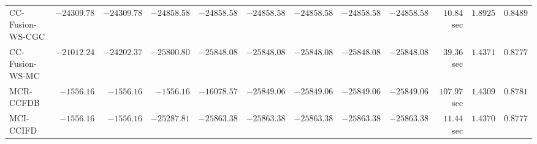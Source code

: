 \begin{table}[H]
\begin{tabular}{lrrrrrrrrrrr}
    CC-Fusion-WS-CGC & $    -24309.78$ & $    -24309.78$ & $    -24858.58$ & $    -24858.58$ & $    -24858.58$ & $    -24858.58$ & $    -24858.58$ & $    -24858.58$ & $        10.84$ sec    & $       1.8925$  & $       0.8489$ \\ 
     CC-Fusion-WS-MC & $    -21012.24$ & $    -24202.37$ & $    -25800.80$ & $    -25848.08$ & $    -25848.08$ & $    -25848.08$ & $    -25848.08$ & $    -25848.08$ & $        39.36$ sec    & $       1.4371$  & $       0.8777$ \\ 
\cmidrule{1-1} 
           MCR-CCFDB & $     -1556.16$ & $     -1556.16$ & $     -1556.16$ & $    -16078.57$ & $    -25849.06$ & $    -25849.06$ & $    -25849.06$ & $    -25849.06$ & $       107.97$ sec    & $       1.4309$  & $       0.8781$ \\ 
\cmidrule{1-1} 
           MCI-CCIFD & $     -1556.16$ & $     -1556.16$ & $    -25287.81$ & $    -25863.38$ & $    -25863.38$ & $    -25863.38$ & $    -25863.38$ & $    -25863.38$ & $        11.44$ sec    & $       1.4370$  & $       0.8777$ \\ 
\bottomrule
\end{tabular}
\end{table}

